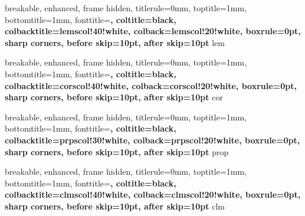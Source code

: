 {
breakable,
    enhanced,
    frame hidden,
    titlerule=0mm,
    toptitle=1mm,
    bottomtitle=1mm,
    fonttitle=\bfseries\large,
    coltitle=black,
    colbacktitle=lemscol!40!white,
    colback=lemscol!20!white,
    boxrule=0pt, sharp corners,
    before skip=10pt, after skip=10pt
}{lem}


{
breakable,
    enhanced,
    frame hidden,
    titlerule=0mm,
    toptitle=1mm,
    bottomtitle=1mm,
    fonttitle=\bfseries\large,
    coltitle=black,
    colbacktitle=corscol!40!white,
    colback=corscol!20!white,
    boxrule=0pt, sharp corners,
    before skip=10pt, after skip=10pt
}{cor}


{
breakable,
    enhanced,
    frame hidden,
    titlerule=0mm,
    toptitle=1mm,
    bottomtitle=1mm,
    fonttitle=\bfseries\large,
    coltitle=black,
    colbacktitle=prpscol!30!white,
    colback=prpscol!20!white,
    boxrule=0pt, sharp corners,
    before skip=10pt, after skip=10pt
}{prop}


{
breakable,
    enhanced,
    frame hidden,
    titlerule=0mm,
    toptitle=1mm,
    bottomtitle=1mm,
    fonttitle=\bfseries\large,
    coltitle=black,
    colbacktitle=clmscol!40!white,
    colback=clmscol!20!white,
    boxrule=0pt, sharp corners,
    before skip=10pt, after skip=10pt
}{clm}



